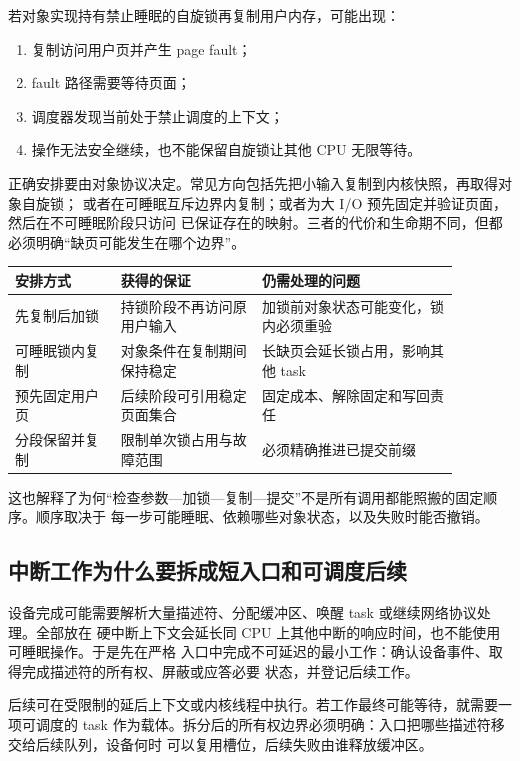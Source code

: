若对象实现持有禁止睡眠的自旋锁再复制用户内存，可能出现：

\begin{enumerate}
\tightlist
\item 复制访问用户页并产生 page fault；
\item fault 路径需要等待页面；
\item 调度器发现当前处于禁止调度的上下文；
\item 操作无法安全继续，也不能保留自旋锁让其他 CPU 无限等待。
\end{enumerate}

正确安排要由对象协议决定。常见方向包括先把小输入复制到内核快照，再取得对象自旋锁；
或者在可睡眠互斥边界内复制；或者为大 I/O 预先固定并验证页面，然后在不可睡眠阶段只访问
已保证存在的映射。三者的代价和生命期不同，但都必须明确“缺页可能发生在哪个边界”。

\begin{longtable}{|L{0.21\linewidth}|L{0.28\linewidth}|L{0.39\linewidth}|}
\hline
安排方式 & 获得的保证 & 仍需处理的问题 \\ \hline
先复制后加锁 & 持锁阶段不再访问原用户输入 & 加锁前对象状态可能变化，锁内必须重验 \\ \hline
可睡眠锁内复制 & 对象条件在复制期间保持稳定 & 长缺页会延长锁占用，影响其他 task \\ \hline
预先固定用户页 & 后续阶段可引用稳定页面集合 & 固定成本、解除固定和写回责任 \\ \hline
分段保留并复制 & 限制单次锁占用与故障范围 & 必须精确推进已提交前缀 \\ \hline
\end{longtable}

这也解释了为何“检查参数—加锁—复制—提交”不是所有调用都能照搬的固定顺序。顺序取决于
每一步可能睡眠、依赖哪些对象状态，以及失败时能否撤销。

\subsection{中断工作为什么要拆成短入口和可调度后续}

设备完成可能需要解析大量描述符、分配缓冲区、唤醒 task 或继续网络协议处理。全部放在
硬中断上下文会延长同 CPU 上其他中断的响应时间，也不能使用可睡眠操作。于是先在严格
入口中完成不可延迟的最小工作：确认设备事件、取得完成描述符的所有权、屏蔽或应答必要
状态，并登记后续工作。

后续可在受限制的延后上下文或内核线程中执行。若工作最终可能等待，就需要一项可调度的
task 作为载体。拆分后的所有权边界必须明确：入口把哪些描述符移交给后续队列，设备何时
可以复用槽位，后续失败由谁释放缓冲区。

